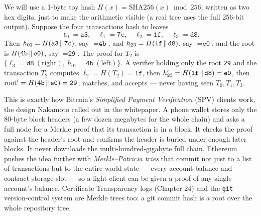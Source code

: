 \begin{example}
\label{ch36:ex-merkle}
We will use a 1-byte toy hash $H(x) = \mathrm{SHA256}(x)\bmod 256$, written as two hex digits, just to make the arithmetic visible (a real tree uses the full 256-bit output). Suppose the four transactions hash to leaves
\[
  \ell_0=\texttt{a3},\quad \ell_1=\texttt{7c},\quad \ell_2=\texttt{1f},\quad \ell_3=\texttt{d8}.
\]
Then $h_{01}=H(\texttt{a3}\,\|\,\texttt{7c})$, say $=\texttt{4b}$, and $h_{23}=H(\texttt{1f}\,\|\,\texttt{d8})$, say $=\texttt{e0}$, and the root is $H(\texttt{4b}\,\|\,\texttt{e0})$, say $=\texttt{29}$. The proof for $T_2$ is $\{\ell_3=\texttt{d8}\ (\text{right}),\ h_{01}=\texttt{4b}\ (\text{left})\}$. A verifier holding only the root \texttt{29} and the transaction $T_2$ computes $\ell_2=H(T_2)=\texttt{1f}$, then $h_{23}'=H(\texttt{1f}\,\|\,\texttt{d8})=\texttt{e0}$, then $\text{root}'=H(\texttt{4b}\,\|\,\texttt{e0})=\texttt{29}$, matches, and accepts --- never having seen $T_0,T_1,T_3$.
\end{example}

\begin{applicationbox}
This is exactly how Bitcoin's \emph{Simplified Payment Verification} (SPV) clients work, the design Nakamoto called out in the whitepaper. A phone wallet stores only the $80$-byte block headers (a few dozen megabytes for the whole chain) and asks a full node for a Merkle proof that its transaction is in a block. It checks the proof against the header's root and confirms the header is buried under enough later blocks. It never downloads the multi-hundred-gigabyte full chain. Ethereum pushes the idea further with \emph{Merkle--Patricia tries} that commit not just to a list of transactions but to the entire world state --- every account balance and contract storage slot --- so a light client can be given a proof of any single account's balance. Certificate Transparency logs (Chapter 24) and the \texttt{git} version-control system are Merkle trees too: a git commit hash is a root over the whole repository tree.
\end{applicationbox}

